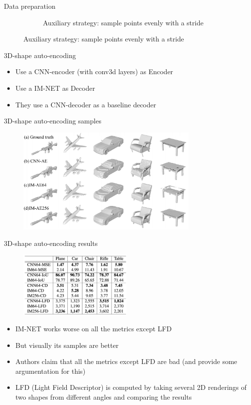 \documentclass[handout, 10pt]{beamer}
\begin{document}
\begin{frame}{Data preparation}
\begin{figure}
\begin{subfigure}{.45\textwidth}
            \caption{Auxiliary strategy: sample points evenly with a stride}
        \end{subfigure}
    \end{figure}
\end{frame}


\begin{frame}{3D-shape auto-encoding}
    \begin{itemize}
        \item\pause Use a CNN-encoder (with conv3d layers) as Encoder
        \item\pause Use a IM-NET as Decoder
        \item\pause They use a CNN-decoder as a baseline decoder
    \end{itemize}
\end{frame}


\begin{frame}{3D-shape auto-encoding samples}
\begin{figure}
    \centering
    \includegraphics[width=0.8\textwidth]{images/3d-shape-autoencoding-samples}
\end{figure}
\end{frame}


\begin{frame}{3D-shape auto-encoding results}
\begin{figure}
    \centering
    \includegraphics[width=0.5\textwidth]{images/3d-shape-autoencoding-results}
\end{figure}
\begin{itemize}
    \item\pause IM-NET works worse on all the metrics except LFD
    \item\pause But visually its samples are better
    \item\pause Authors claim that all the metrics except LFD are bad (and provide some argumentation for this)
    \item\pause LFD (Light Field Descriptor) is computed by taking several 2D renderings of two shapes from different angles and comparing the results
\end{itemize}
\end{frame}
\end{document}
